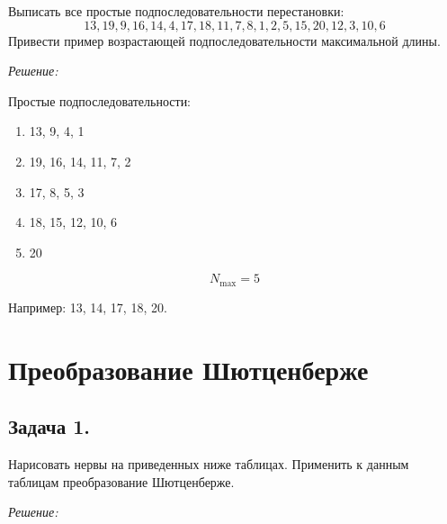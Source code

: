 Выписать все простые подпоследовательности перестановки:
\[ 13, 19, 9, 16, 14, 4, 17, 18, 11, 7, 8, 1, 2, 5, 15, 20, 12, 3, 10, 6 \]
Привести пример возрастающей подпоследовательности максимальной длины.

\noindent\textit{Решение:}

Простые подпоследовательности:
\begin{enumerate}
	\item 13, 9, 4, 1
	\item 19, 16, 14, 11, 7, 2
	\item 17, 8, 5, 3
	\item 18, 15, 12, 10, 6
	\item 20	
\end{enumerate}

\[ N_{\max} = 5 \]

Например: 13, 14, 17, 18, 20.

\section{Преобразование Шютценберже}

\subsection*{Задача 1.}

Нарисовать нервы на приведенных ниже таблицах. Применить к данным таблицам преобразование Шютценберже.
\begin{figure}[H]
\end{figure}

\noindent\textit{Решение:}

\begin{figure}[H]
\end{figure}

